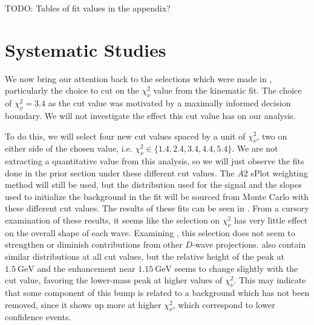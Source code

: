 {\color{red}TODO: Tables of fit values in the appendix?}

\section{Systematic Studies}\label{sec:systematic-studies}

We now bring our attention back to the selections which were made in , particularly the choice to cut on the $\chi^2_\nu$ value from the kinematic fit. The choice of $\chi^2_\nu = 3.4$ as the cut value was motivated by a maximally informed decision boundary. We will not investigate the effect this cut value has on our analysis.

To do this, we will select four new cut values spaced by a unit of $\chi^2_\nu$, two on either side of the chosen value, i.e. $\chi^2_\nu \in \{1.4, 2.4, 3.4, 4.4, 5.4\}$. We are not extracting a quantitative value from this analysis, so we will just observe the fits done in the prior section under these different cut values. The $A2$ sPlot weighting method will still be used, but the distribution used for the signal and the slopes used to initialize the background in the fit will be sourced from Monte Carlo with these different cut values. The results of these fits can be seen in . From a cursory examination of these results, it seems like the selection on $\chi^2_\nu$ has very little effect on the overall shape of each wave. Examining , this selection does not seem to strengthen or diminish contributions from other $D$-wave projections.  also contain similar distributions at all cut values, but the relative height of the peak at $\SI{1.5}{\giga\electronvolt}$ and the enhancement near $\SI{1.15}{\giga\electronvolt}$ seems to change slightly with the cut value, favoring the lower-mass peak at higher values of $\chi^2_\nu$. This may indicate that some component of this bump is related to a background which has not been removed, since it shows up more at higher $\chi^2_\nu$, which correspond to lower confidence events.

